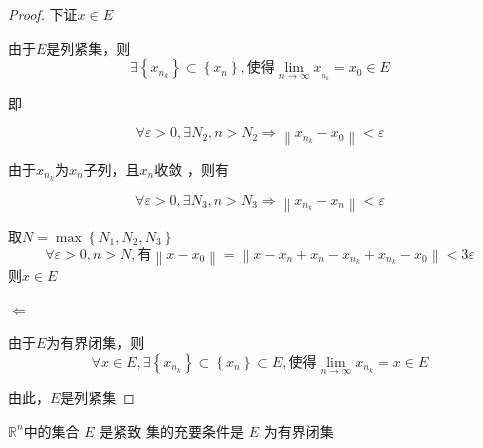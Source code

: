\documentclass[lang=cn,10pt]{elegantbook}
\begin{document}
\begin{proof}
		下证$x\in E$
		
		由于$E$是列紧集，则
		\begin{equation*}
			\exists \left\{ x_{n_{k}} \right\}\subset\left\{ x_n \right\},\text{使得}\underset{n\rightarrow \infty}{\lim}x_{_{n_{k}}}=x_{0}\in E
		\end{equation*}
		
		即
		
		\begin{equation*}
			\forall \varepsilon>0 ,\exists N_{2},n>N_{2}\Rightarrow \left\| x_{n_{k}}-x_{0} \right\| <\varepsilon
		\end{equation*}
		
		由于$x_{n_{k}}$为$x_{n}$子列，且$x_{n}$收敛
		，则有
		
		\begin{equation*}
			\forall \varepsilon>0 ,\exists N_{3},n>N_{3}\Rightarrow \left\| x_{n_{k}}-x_{n} \right\| <\varepsilon
		\end{equation*}
		
		取$N=\max \left\{ N_1,N_2,N_3 \right\} $
		\begin{equation*}
			\forall \varepsilon >0,n>N,\text{有}\left\| x-x_0 \right\| =\left\| x-x_n+x_n-x_{n_k}+x_{n_k}-x_0 \right\| <3\varepsilon 
		\end{equation*}
		则$x\in E$
		
		$\Leftarrow$
		
		由于$E$为有界闭集，则
		\begin{equation*}
			\forall x\in E,\exists \left\{ x_{n_k} \right\} \subset \left\{ x_n \right\} \subset E,\text{使得}\underset{n\rightarrow \infty}{\lim}x_{n_k}=x\in E
		\end{equation*}
		
		由此，$E$是列紧集
	\end{proof}
	\begin{theorem}
		$ \mathbb{R} ^n$中的集合 $E$ 是紧致
		集的充要条件是 $E$ 为有界闭集
	\end{theorem}
\end{document}
